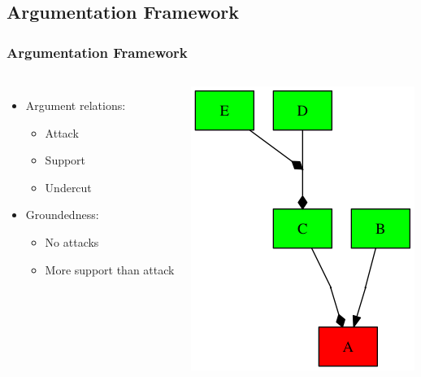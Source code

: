 \documentclass{beamer}
\begin{document}
\subsection{Argumentation Framework}
\begin{frame}
    \frametitle{Argumentation Framework}
    \begin{columns}
        \begin{itemize}
            \item Argument relations:
                \begin{itemize}
                    \item Attack
                    \item Support
                    \item Undercut
                \end{itemize}
            \item Groundedness:
                \begin{itemize}
                    \item No attacks
                    \item More support than attack
                \end{itemize}
        \end{itemize}
        \includegraphics[width=\textwidth]{framework.png}
    \end{columns}
\end{frame}
\end{document}
